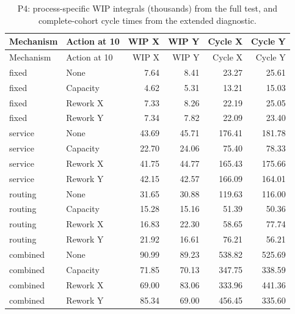 \begin{longtable}{llrrrr}\caption{P4: process-specific WIP integrals (thousands) from the full test, and complete-cohort cycle times from the extended diagnostic.}\\\toprule

Mechanism & Action at 10 & WIP X & WIP Y & Cycle X & Cycle Y\\\midrule\endfirsthead

\toprule Mechanism & Action at 10 & WIP X & WIP Y & Cycle X & Cycle Y\\\midrule\endhead

fixed & None & 7.64 & 8.41 & 23.27 & 25.61\\

fixed & Capacity & 4.62 & 5.31 & 13.21 & 15.03\\

fixed & Rework X & 7.33 & 8.26 & 22.19 & 25.05\\

fixed & Rework Y & 7.34 & 7.82 & 22.09 & 23.40\\

service & None & 43.69 & 45.71 & 176.41 & 181.78\\

service & Capacity & 22.70 & 24.06 & 75.40 & 78.33\\

service & Rework X & 41.75 & 44.77 & 165.43 & 175.66\\

service & Rework Y & 42.15 & 42.57 & 166.09 & 164.01\\

routing & None & 31.65 & 30.88 & 119.63 & 116.00\\

routing & Capacity & 15.28 & 15.16 & 51.39 & 50.36\\

routing & Rework X & 16.83 & 22.30 & 58.65 & 77.74\\

routing & Rework Y & 21.92 & 16.61 & 76.21 & 56.21\\

combined & None & 90.99 & 89.23 & 538.82 & 525.69\\

combined & Capacity & 71.85 & 70.13 & 347.75 & 338.59\\

combined & Rework X & 69.00 & 83.06 & 333.96 & 441.36\\

combined & Rework Y & 85.34 & 69.00 & 456.45 & 335.60\\

\bottomrule\end{longtable}

